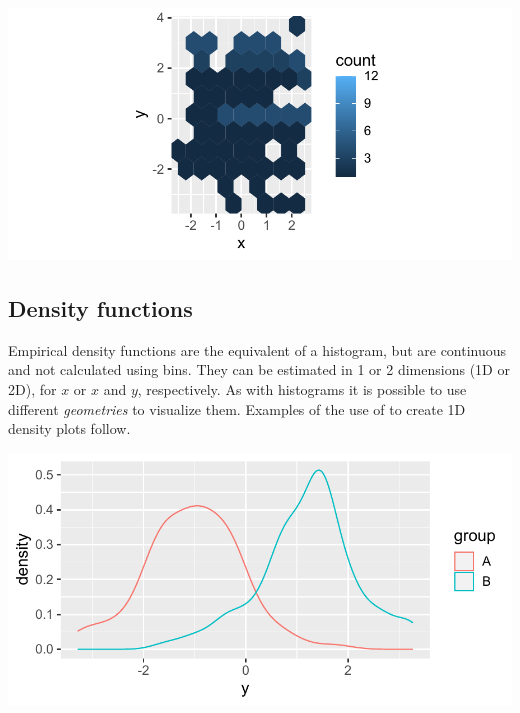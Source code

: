 \documentclass[krantz2]{krantz}\usepackage{knitr}
\begin{document}
\begin{knitrout}\footnotesize
{}\color{fgcolor}\begin{kframe}
\begin{alltt}
  \hlopt{+}
  \hlstd{(} \hlstd{=} \hlstd{)} \hlopt{+}
  \hlstd{()}
\end{alltt}
\end{kframe}

{\centering \includegraphics[width=.7\textwidth]{figure/pos-hex-plot-01-1} 

}



\end{knitrout}

\subsection{Density functions}\label{sec:plot:density}
Empirical density functions are the equivalent of a histogram, but are continuous and not calculated using bins. They can be estimated in 1 or 2 dimensions (1D or 2D), for $x$ or $x$ and $y$, respectively. As with histograms it is possible to use different \emph{geometries} to visualize them. Examples of the use of  to create 1D density plots follow.

\begin{knitrout}\footnotesize
{}\color{fgcolor}\begin{kframe}
\begin{alltt}
    \hlopt{+}
  \hlstd{()}
\end{alltt}
\end{kframe}

{\centering \includegraphics[width=.7\textwidth]{figure/pos-density-plot-01-1} 

}



\end{knitrout}
\end{document}
